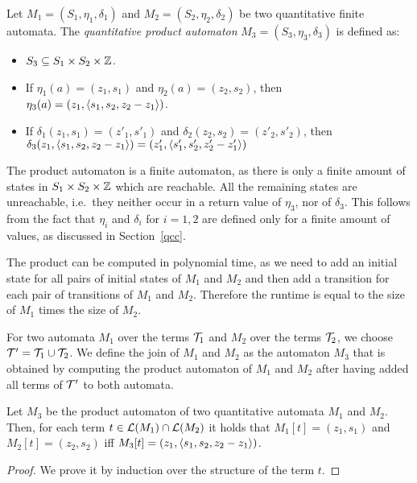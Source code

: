 \begin{definition}
    Let $M_1 = (S_1,\eta_1,\delta_1)$ and $M_2 = (S_2, \eta_2,\delta_2)$ be two quantitative finite automata. The \emph{quantitative product automaton} $M_3 = (S_3, \eta_3, \delta_3)$ is defined as:
    \begin{itemize}
        \item $S_3 \subseteq S_1 \times S_2 \times \mathbb{Z}$.
        \item If $\eta_1(a) = (z_1, s_1)$ and $\eta_2(a) = (z_2, s_2)$, then
              $\eta_3(a) = (z_1, \langle s_1, s_2, z_2-z_1\rangle)$.
        \item If $\delta_1(z_1, s_1) = (z'_1, s'_1)$ and $\delta_2(z_2, s_2) = (z'_2, s'_2)$, then $\delta_3(z_1, \langle s_1, s_2, z_2 - z_1\rangle) =  (z'_1, \langle s'_1, s'_2, z'_2 -z'_1\rangle)$
    \end{itemize}
\end{definition}

The product automaton is a finite automaton, as there is only a finite amount of states in $S_1 \times S_2 \times \mathbb{Z}$ which are reachable.
All the remaining states are unreachable, i.e.\ they neither occur in a return value of $\eta_3$, nor of $\delta_3$.
This follows from the fact that $\eta_i$ and $\delta_i$ for $i = 1,2$ are defined only for a finite amount of values, as discussed in Section~\ref{qcc}.

The product can be computed in polynomial time, as we need to add an initial state for all pairs of initial states of $M_1$ and $M_2$ and then add a transition for each pair of transitions of $M_1$ and $M_2$. Therefore the runtime is equal to the size of $M_1$ times the size of $M_2$.

For two automata $M_1$ over the terms $\mathcal{T}_1$ and $M_2$ over the terms $\mathcal{T}_2$, we choose $\mathcal{T}' = \mathcal{T}_1 \cup \mathcal{T}_2$.
We define the join of $M_1$ and $M_2$ as the automaton $M_3$ that is obtained by computing the product automaton of $M_1$ and $M_2$ after having added all terms of $\mathcal{T}'$ to both automata.

\begin{lemma}\label{lemma:join-automata}
    Let $M_3$ be the product automaton of two quantitative automata $M_1$ and $M_2$.
    Then, for each term $t \in \mathcal{L}(M_1) \cap \mathcal{L}(M_2)$ it holds that $M_1[t] = (z_1, s_1)$ and $M_2[t] = (z_2, s_2)$ iff $M_3[t] = (z_1, \langle s_1, s_2, z_2 - z_1\rangle)$.
\end{lemma}
\begin{proof}
    We prove it by induction over the structure of the term $t$.
\end{proof}

